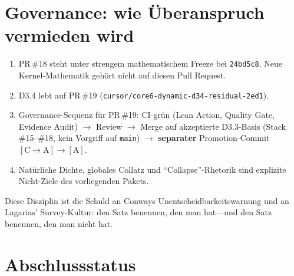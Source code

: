 \documentclass[11pt,a4paper]{article}
\theoremstyle{definition}
\theoremstyle{remark}
\newcommand{\CA}{\ensuremath{[\mathrm{C}\!\to\!\mathrm{A}]}}
\newcommand{\tagA}{\ensuremath{[\mathrm{A}]}}
\begin{document}
\section{Governance: wie Überanspruch vermieden wird}

\begin{enumerate}[leftmargin=*]
  \item PR\,\#18 steht unter strengem mathematischem Freeze bei
  \texttt{24bd5c8}. Neue Kernel-Mathematik gehört nicht auf diesen Pull Request.
  \item D3.4 lebt auf PR\,\#19
  (\texttt{cursor/core6-dynamic-d34-residual-2ed1}).
  \item Governance-Sequenz für PR\,\#19:
  CI-grün (Lean Action, Quality Gate, Evidence Audit)
  $\to$ Review
  $\to$ Merge auf akzeptierte D3.3-Basis (Stack \#15--\#18, kein Vorgriff auf
  \texttt{main})
  $\to$ \textbf{separater} Promotion-Commit $\CA\to\tagA$.
  \item Natürliche Dichte, globales Collatz und ``Collapse''-Rhetorik sind
  explizite Nicht-Ziele des vorliegenden Pakets.
\end{enumerate}

Diese Disziplin ist die Schuld an Conways Unentscheidbarkeitswarnung und an
Lagarias' Survey-Kultur: den Satz benennen, den man hat---und den Satz
benennen, den man nicht hat.

\section{Abschlussstatus}
\end{document}
